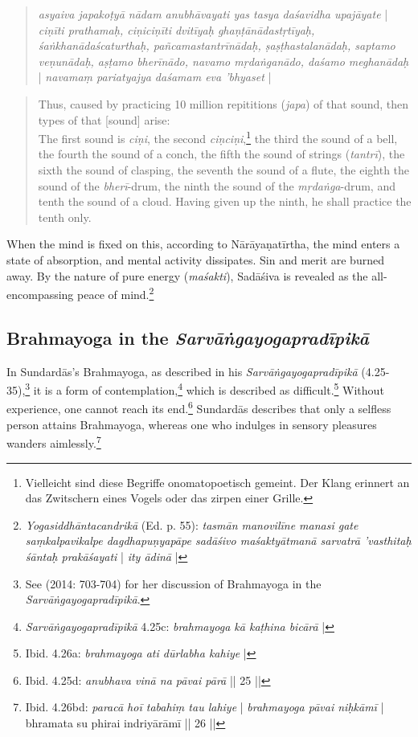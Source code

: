 \begin{quote}
  \textit{asyaiva japakoṭyā nādam anubhāvayati yas tasya daśavidha upajāyate} | 
  \textit{ciṇīti prathamaḥ, ciṇiciṇīti dvitīyaḥ ghaṇṭānādastṛtīyaḥ, śaṅkhanādaścaturthaḥ, pañcamastantrīnādaḥ, ṣaṣṭhastalanādaḥ, saptamo veṇunādaḥ, aṣṭamo bherīnādo, navamo mṛdaṅganādo, daśamo meghanādaḥ} | \textit{navamaṃ pariatyajya daśamam eva 'bhyaset} |
\end{quote}
\begin{quote}
  Thus, caused by practicing 10 million repititions (\textit{japa}) of that sound, then types of that [sound] arise: \\
  The first sound is \textit{ciṇi}, the second \textit{ciṇciṇi},\footnote{Vielleicht sind diese Begriffe onomatopoetisch gemeint. Der Klang erinnert an das Zwitschern eines Vogels oder das zirpen einer Grille.} the third the sound of a bell, the fourth the sound of a conch, the fifth the sound of strings (\textit{tantrī}), the sixth the sound of clasping, the seventh the sound of a flute, the eighth the sound of the \textit{bherī}-drum, the ninth the sound of the \textit{mṛdaṅga}-drum, and tenth the sound of a cloud. Having given up the ninth, he shall practice the tenth only. 
\end{quote}

When the mind is fixed on this, according to Nārāyaṇatīrtha, the mind enters a state of absorption, and mental activity dissipates. Sin and merit are burned away. By the nature of pure energy (\textit{maśakti}), Sadāśiva is revealed as the all-encompassing peace of mind.\footnote{\textit{Yogasiddhāntacandrikā} (Ed. p. 55): \textit{tasmān manovilīne manasi gate saṃkalpavikalpe dagdhapuṇyapāpe sadāśivo maśaktyātmanā sarvatrā 'vasthitaḥ śāntaḥ prakāśayati} | \textit{ity ādinā} |}

\subsection{Brahmayoga in the \textit{Sarvāṅgayogapradīpikā}}
\label{sundarbrahma}
In Sundardās's Brahmayoga, as described in his \textit{Sarvāṅgayogapradīpikā} (4.25-35),\footnote{See \citeauthor{burger2014sarvangayogapradipika} (2014: 703-704) for her discussion of Brahmayoga in the \textit{Sarvāṅgayogapradīpikā}.} it is a form of contemplation,\footnote{\textit{Sarvāṅgayogapradīpikā} 4.25c: \textit{brahmayoga kā kaṭhina bicārā} |} which is described as difficult.\footnote{Ibid. 4.26a: \textit{brahmayoga ati dūrlabha kahiye} |} Without experience, one cannot reach its end.\footnote{Ibid. 4.25d: \textit{anubhava vinā na pāvai pārā} || 25 ||} Sundardās describes that only a selfless person attains Brahmayoga, whereas one who indulges in sensory pleasures wanders aimlessly.\footnote{Ibid. 4.26bd: \textit{paracā hoī tabahiṃ tau lahiye} | \textit{brahmayoga pāvai niḥkāmī} | bhramata su phirai indriyārāmī || 26 ||}

